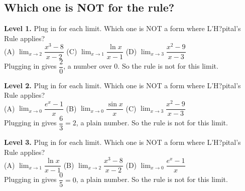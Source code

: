 \documentclass[11pt]{article}
\begin{document}
\subsection*{Which one is NOT for the rule?}
\noindent\textbf{Level 1.} Plug in for each limit. Which one is NOT a form where L'H?pital's Rule applies?\\ (A) $\displaystyle\lim_{x\to2}\dfrac{x^3-8}{x-2}$ \quad {} \quad (C) $\displaystyle\lim_{x\to1}\dfrac{\ln x}{x-1}$ \quad (D) $\displaystyle\lim_{x\to3}\dfrac{x^2-9}{x-3}$\\  \quad Plugging in gives $\dfrac20$, a number over 0. So the rule is not for this limit.\par\medskip
\noindent\textbf{Level 2.} Plug in for each limit. Which one is NOT a form where L'H?pital's Rule applies?\\ (A) $\displaystyle\lim_{x\to0}\dfrac{e^x-1}{x}$ \quad (B) $\displaystyle\lim_{x\to0}\dfrac{\sin x}{x}$ \quad (C) $\displaystyle\lim_{x\to3}\dfrac{x^2-9}{x-3}$ \quad {}\\  \quad Plugging in gives $\dfrac63=2$, a plain number. So the rule is not for this limit.\par\medskip
\noindent\textbf{Level 3.} Plug in for each limit. Which one is NOT a form where L'H?pital's Rule applies?\\ (A) $\displaystyle\lim_{x\to1}\dfrac{\ln x}{x-1}$ \quad (B) $\displaystyle\lim_{x\to2}\dfrac{x^3-8}{x-2}$ \quad {} \quad (D) $\displaystyle\lim_{x\to0}\dfrac{e^x-1}{x}$\\  \quad Plugging in gives $\dfrac05=0$, a plain number. So the rule is not for this limit.\par\medskip
\end{document}
